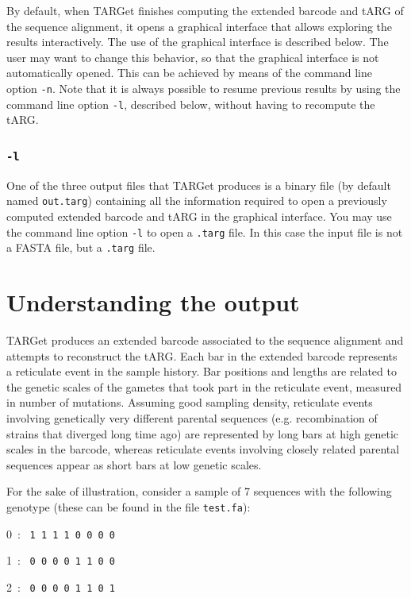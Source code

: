 \documentclass[12pt]{article}
\begin{document}
By default, when TARGet finishes computing the extended barcode and tARG of the sequence alignment, it opens a graphical interface that allows exploring the results interactively. The use of the graphical interface is described below. The user may want to change this behavior, so that the graphical interface is not automatically opened. This can be achieved by means of the command line option \texttt{-n}. Note that it is always possible to resume previous results by using the command line option \texttt{-l}, described below, without having to recompute the tARG.

\subsubsection*{\texttt{-l}}

One of the three output files that TARGet produces is a binary file (by default named \texttt{out.targ}) containing all the information required to open a previously computed extended barcode and tARG in the graphical interface. You may use the command line option \texttt{-l} to open a \texttt{.targ} file. In this case the input file is not a FASTA file, but a \texttt{.targ} file.

\section{Understanding the output}

TARGet produces an extended barcode associated to the sequence alignment and attempts to reconstruct the tARG. Each bar in the extended barcode represents a reticulate event in the sample history. Bar positions and lengths are related to the genetic scales of the gametes that took part in the reticulate event, measured in number of mutations. Assuming good sampling density, reticulate events involving genetically very different parental sequences (e.g. recombination of strains that diverged long time ago) are represented by long bars at high genetic scales in the barcode, whereas reticulate events involving closely related parental sequences appear as short bars at low genetic scales.

For the sake of illustration, consider a sample of 7 sequences with the following genotype (these can be found in the file \texttt{test.fa}):

0\ : \ \texttt{1 1 1 1 0 0 0 0}

1\ : \ \texttt{0 0 0 0 1 1 0 0}

2\ : \ \texttt{0 0 0 0 1 1 0 1}
\end{document}
